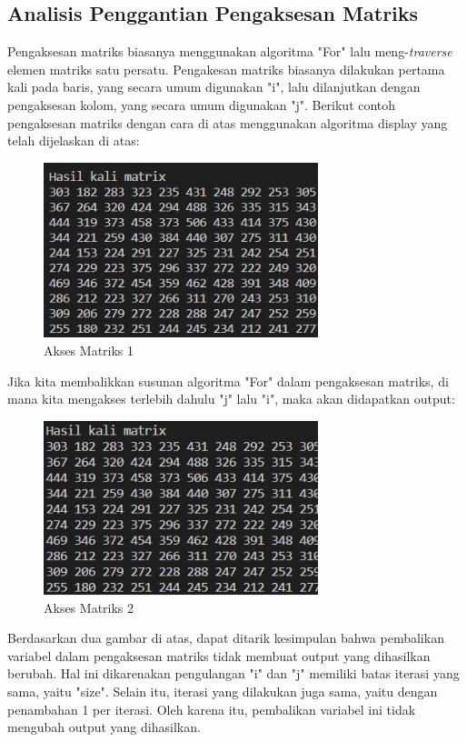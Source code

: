 \documentclass[conference]{IEEEtran}
\begin{document}
\subsection{Analisis Penggantian Pengaksesan Matriks}
Pengaksesan matriks biasanya menggunakan algoritma "For" lalu
meng-\emph{traverse} elemen matriks satu persatu. Pengakesan matriks biasanya 
dilakukan pertama kali pada baris, yang secara umum digunakan "i", lalu
dilanjutkan dengan pengaksesan kolom, yang secara umum digunakan "j". Berikut
contoh pengaksesan matriks dengan cara di atas menggunakan algoritma display
yang telah dijelaskan di atas:

\begin{figure} [htbp]
    \includegraphics[width=8cm]{gambar/Akses Matriks 1.png}
    \centering
    \caption{Akses Matriks 1}
\end{figure}

Jika kita membalikkan susunan algoritma "For" dalam pengaksesan matriks, di mana
kita mengakses terlebih dahulu "j" lalu "i", maka akan didapatkan output:

\begin{figure} [htbp]
    \includegraphics[width=8cm]{gambar/Akses Matriks 2.png}
    \centering
    \caption{Akses Matriks 2}
\end{figure}

Berdasarkan dua gambar di atas, dapat ditarik kesimpulan bahwa pembalikan variabel
dalam pengaksesan matriks tidak membuat output yang dihasilkan berubah. Hal ini dikarenakan
pengulangan "i" dan "j" memiliki batas iterasi yang sama, yaitu "size". Selain itu, iterasi
yang dilakukan juga sama, yaitu dengan penambahan 1 per iterasi. Oleh karena itu, pembalikan
variabel ini tidak mengubah output yang dihasilkan.
\end{document}
